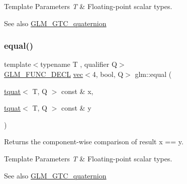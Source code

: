 \begin{DoxyTemplParams}{Template Parameters}
{\em T} & Floating-\/point scalar types.\\
\hline
\end{DoxyTemplParams}
\begin{DoxySeeAlso}{See also}
\mbox{\hyperlink{group__gtc__quaternion}{G\+L\+M\+\_\+\+G\+T\+C\+\_\+quaternion}} 
\end{DoxySeeAlso}
\mbox{\label{group__gtc__quaternion_ga22089a76bfb7b45b4c34961bb715e2df}} 
\subsubsection{\texorpdfstring{equal()}{equal()}}
{\footnotesize\ttfamily template$<$typename T , qualifier Q$>$ \\
\mbox{\hyperlink{setup_8hpp_ab2d052de21a70539923e9bcbf6e83a51}{G\+L\+M\+\_\+\+F\+U\+N\+C\+\_\+\+D\+E\+CL}} \mbox{\hyperlink{structglm_1_1vec}{vec}}$<$4, bool, Q$>$ glm\+::equal (\begin{DoxyParamCaption}\item[{\mbox{\hyperlink{structglm_1_1tquat}{tquat}}$<$ T, Q $>$ const \&}]{x,  }\item[{\mbox{\hyperlink{structglm_1_1tquat}{tquat}}$<$ T, Q $>$ const \&}]{y }\end{DoxyParamCaption})}

Returns the component-\/wise comparison of result x == y.


\begin{DoxyTemplParams}{Template Parameters}
{\em T} & Floating-\/point scalar types.\\
\hline
\end{DoxyTemplParams}
\begin{DoxySeeAlso}{See also}
\mbox{\hyperlink{group__gtc__quaternion}{G\+L\+M\+\_\+\+G\+T\+C\+\_\+quaternion}} 
\end{DoxySeeAlso}
\mbox{\label{group__gtc__quaternion_gaf21424fa62e03de8b11c2b776c17d7a3}} 
